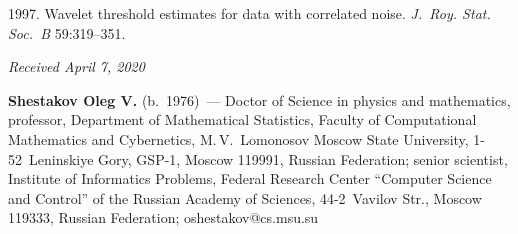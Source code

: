 \begin{multicols}{2}
{{\begin{thebibliography}{99}

 1997. Wavelet threshold estimates for data with 
correlated noise. \textit{J.~Roy. Stat. Soc.~B} 59:319--351.

\end{thebibliography}

 }
 }

\end{multicols}

\vspace*{-6pt}

\hfill{\small\textit{Received April 7, 2020}}



\Contrl

\noindent
\textbf{Shestakov Oleg V.} (b.\ 1976)~--- Doctor of Science in physics and mathematics, professor, 
Department of Mathematical Statistics, Faculty of Computational Mathematics and Cybernetics, 
M.\,V.~Lomonosov Moscow State University, 1-52~Leninskiye Gory, GSP-1, Moscow 119991, 
Russian Federation; senior scientist, Institute of Informatics Problems, Federal Research Center 
``Computer Science and Control'' of the Russian Academy of Sciences, 44-2~Vavilov Str., Moscow 
119333, Russian Federation; \mbox{oshestakov@cs.msu.su}
\label{end\stat}

\renewcommand{\bibname}{\protect\rm Литература} 